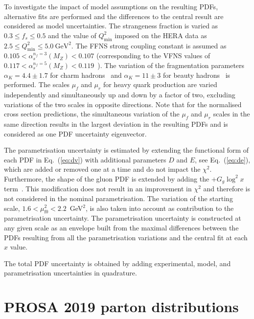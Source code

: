 \documentclass[12pt]{article}
\begin{document}
To investigate the impact of model assumptions on the resulting PDFs, alternative fits are performed and the differences to the central result are considered as model uncertainties. The strangeness fraction is varied as $0.3 \leq f_{s} \leq 0.5$ and the value of $Q^2_{\text{min}}$ imposed on the HERA data as $2.5 \leq Q^2_\textrm{min}\leq 5.0~\textrm{GeV}^2$. The FFNS strong coupling constant is assumed as $0.105 < \alpha_s^{n_f=3}(M_Z) < 0.107$ (corresponding to the VFNS values of $0.117 < \alpha_s^{n_f=5}(M_Z) < 0.119$~\cite{Tanabashi:2018oca}). The variation of the fragmentation parameters $\alpha_K = 4.4 \pm 1.7$ for charm hadrons~\cite{Aaron:2008ac,Chekanov:2008ur} and $\alpha_K = 11 \pm 3$ for beauty hadrons~\cite{Nason:1999zj} is performed.
The scales $\mu_f$ and $\mu_r$ for heavy quark production are varied independently and simultaneously up and down by a factor of two, excluding variations of the two scales in opposite directions. Note that for 
the normalised cross section predictions, the simultaneous variation of the $\mu_f$ and $\mu_r$ scales in the same direction results in the largest deviation in the 
resulting PDFs and is considered as one PDF uncertainty eigenvector.

The parametrisation uncertainty is estimated by extending the functional form of each PDF in Eq.~(\ref{eq:dv}) with additional parameters $D$ and $E$, see Eq.~(\ref{eq:de}), 
which are added or removed one at a time and do not impact the $\chi^2$. 
Furthermore, the shape of the gluon PDF is extended by adding the $+G_g\log^2 x$ term~\cite{Bonvini:2019wxf}. This modification does not result in an improvement in $\chi^2$ and therefore is not considered in the nominal parametrisation. 
The variation of the starting scale, $1.6 < \mu_\mathrm{f0}^2 < 2.2$~GeV$^2$, is also taken into account as contribution to the parametrisation uncertainty. The parametrisation uncertainty is constructed at any given scale as an envelope built from the maximal differences between the PDFs resulting from all the parametrisation variations and the central fit at each $x$ value.

The total PDF uncertainty is obtained by adding experimental, model, and parametrisation  uncertainties in quadrature.


%
%


\section{PROSA 2019 parton distributions}
\label{sec:results}
\end{document}
